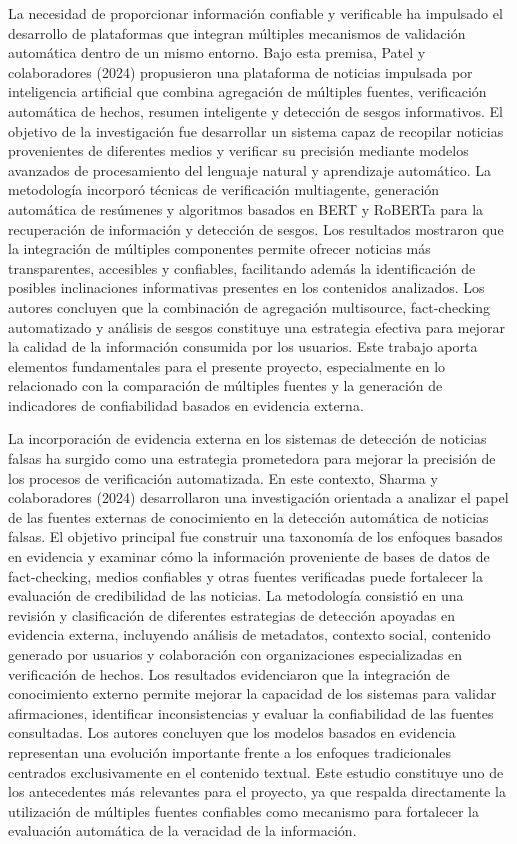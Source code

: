\documentclass[12pt]{article}
\begin{document}
La necesidad de proporcionar información confiable y verificable ha impulsado el desarrollo de plataformas que integran múltiples mecanismos de validación automática dentro de un mismo entorno. Bajo esta premisa, Patel y colaboradores (2024) propusieron una plataforma de noticias impulsada por inteligencia artificial que combina agregación de múltiples fuentes, verificación automática de hechos, resumen inteligente y detección de sesgos informativos. El objetivo de la investigación fue desarrollar un sistema capaz de recopilar noticias provenientes de diferentes medios y verificar su precisión mediante modelos avanzados de procesamiento del lenguaje natural y aprendizaje automático. La metodología incorporó técnicas de verificación multiagente, generación automática de resúmenes y algoritmos basados en BERT y RoBERTa para la recuperación de información y detección de sesgos. Los resultados mostraron que la integración de múltiples componentes permite ofrecer noticias más transparentes, accesibles y confiables, facilitando además la identificación de posibles inclinaciones informativas presentes en los contenidos analizados. Los autores concluyen que la combinación de agregación multisource, fact-checking automatizado y análisis de sesgos constituye una estrategia efectiva para mejorar la calidad de la información consumida por los usuarios. Este trabajo aporta elementos fundamentales para el presente proyecto, especialmente en lo relacionado con la comparación de múltiples fuentes y la generación de indicadores de confiabilidad basados en evidencia externa.

La incorporación de evidencia externa en los sistemas de detección de noticias falsas ha surgido como una estrategia prometedora para mejorar la precisión de los procesos de verificación automatizada. En este contexto, Sharma y colaboradores (2024) desarrollaron una investigación orientada a analizar el papel de las fuentes externas de conocimiento en la detección automática de noticias falsas. El objetivo principal fue construir una taxonomía de los enfoques basados en evidencia y examinar cómo la información proveniente de bases de datos de fact-checking, medios confiables y otras fuentes verificadas puede fortalecer la evaluación de credibilidad de las noticias. La metodología consistió en una revisión y clasificación de diferentes estrategias de detección apoyadas en evidencia externa, incluyendo análisis de metadatos, contexto social, contenido generado por usuarios y colaboración con organizaciones especializadas en verificación de hechos. Los resultados evidenciaron que la integración de conocimiento externo permite mejorar la capacidad de los sistemas para validar afirmaciones, identificar inconsistencias y evaluar la confiabilidad de las fuentes consultadas. Los autores concluyen que los modelos basados en evidencia representan una evolución importante frente a los enfoques tradicionales centrados exclusivamente en el contenido textual. Este estudio constituye uno de los antecedentes más relevantes para el proyecto, ya que respalda directamente la utilización de múltiples fuentes confiables como mecanismo para fortalecer la evaluación automática de la veracidad de la información. 
\end{document}

